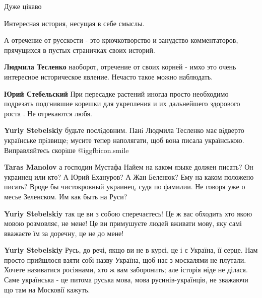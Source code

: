 
 
 
 
 
\zzSecCmt

\begin{itemize} %
Дуже цікаво


Интересная история, несущая в себе смыслы.

А отречение от русскости - это крючкотворство и занудство
комментаторов, прячущихся в пустых страничках своих историй.

\begin{itemize} %
\textbf{Людмила Тесленко} наоборот, отречение от своих корней - имхо это очень интересное историческое явление. Нечасто такое можно наблюдать.

\begin{itemize} %
\textbf{Юрий Стебельский} При пересадке растений иногда просто необходимо подрезать подгнившие корешки для укрепления и их дальнейшего здорового роста .
Не отрекаются любя.

\textbf{Yuriy Stebelskiy} будьте послiдовним. Панi Людмила Тесленко має вiдверто українське прiзвище; мусите тепер наполягати, щоб вона писала українською. Виправляйтесь скорiше  @igg{fbicon.smile} 

\textbf{Taras Manolov} а господин Мустафа Найем на каком языке должен писать? Он украинец или кто? А Юрий Ехануров? А Жан Беленюк? Ему на каком положено писать? Вроде бы чистокровный украинец, судя по фамилии. Не говоря уже о месье Зеленском.
Им как быть на Руси?

\textbf{Yuriy Stebelskiy} так це ви з собою сперечаєтесь! Це ж вас обходить хто якою мовою розмовляє, не мене! Це ви примушуєте людей вживати мову, яку самі вважаєте їм за доречну, це не до мене!

\textbf{Yuriy Stebelskiy} Русь, до речі, якщо ви не в курсі, це і є Україна, її серце. Нам просто прийшлося взяти собі назву Україна, щоб нас з москалями не плутали. Хочете називатися росіянами, хто ж вам заборонить; але історія ніде не ділася. Саме українська - це питома руська мова, мова русинів-українців, не зважаючи що там на Московії кажуть.
\end{itemize} %


\end{itemize}
\end{itemize}
